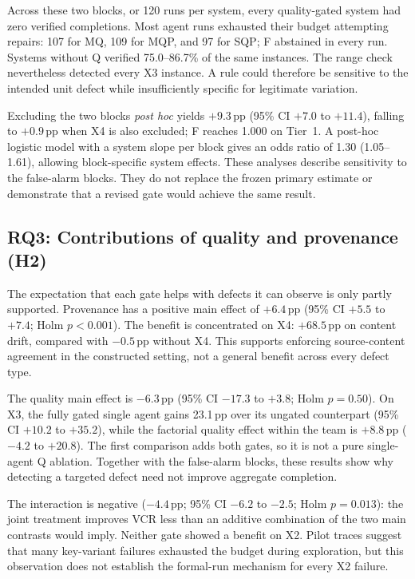 \documentclass[conference]{IEEEtran}
\newcommand{\sys}[1]{\textsf{#1}}
\begin{document}
Across these two blocks, or 120 runs per system, every quality-gated system had zero verified completions. Most agent runs exhausted their budget attempting repairs: 107 for \sys{MQ}, 109 for \sys{MQP}, and 97 for \sys{SQP}; \sys{F} abstained in every run. Systems without Q verified 75.0--86.7\% of the same instances. The range check nevertheless detected every X3 instance. A rule could therefore be sensitive to the intended unit defect while insufficiently specific for legitimate variation.

Excluding the two blocks \emph{post hoc} yields $+9.3$\,pp (95\% CI $+7.0$ to $+11.4$), falling to $+0.9$\,pp when X4 is also excluded; \sys{F} reaches 1.000 on Tier~1. A post-hoc logistic model with a system slope per block gives an odds ratio of 1.30 (1.05--1.61), allowing block-specific system effects. These analyses describe sensitivity to the false-alarm blocks. They do not replace the frozen primary estimate or demonstrate that a revised gate would achieve the same result.

\subsection{RQ3: Contributions of quality and provenance (H2)}
The expectation that each gate helps with defects it can observe is only partly supported. Provenance has a positive main effect of $+6.4$\,pp (95\% CI $+5.5$ to $+7.4$; Holm $p<0.001$). The benefit is concentrated on X4: $+68.5$\,pp on content drift, compared with $-0.5$\,pp without X4. This supports enforcing source-content agreement in the constructed setting, not a general benefit across every defect type.

The quality main effect is $-6.3$\,pp (95\% CI $-17.3$ to $+3.8$; Holm $p=0.50$). On X3, the fully gated single agent gains 23.1\,pp over its ungated counterpart (95\% CI $+10.2$ to $+35.2$), while the factorial quality effect within the team is $+8.8$\,pp ($-4.2$ to $+20.8$). The first comparison adds both gates, so it is not a pure single-agent Q ablation. Together with the false-alarm blocks, these results show why detecting a targeted defect need not improve aggregate completion.

The interaction is negative ($-4.4$\,pp; 95\% CI $-6.2$ to $-2.5$; Holm $p=0.013$): the joint treatment improves VCR less than an additive combination of the two main contrasts would imply. Neither gate showed a benefit on X2. Pilot traces suggest that many key-variant failures exhausted the budget during exploration, but this observation does not establish the formal-run mechanism for every X2 failure.
\end{document}

